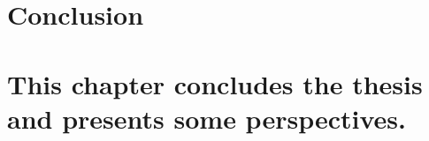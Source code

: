 \chapter{Conclusion}
\label{chapt:conclusion}
\chapter{This chapter concludes the thesis and presents some perspectives.}